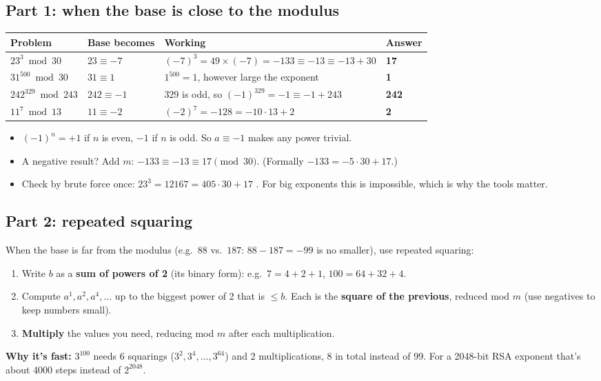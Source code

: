 \subsection{Part 1: when the base is close to the modulus}
\begin{center}\small
\begin{tabularx}{\textwidth}{@{}l l X l@{}}
\toprule
Problem & Base becomes & Working & Answer\\
\midrule
$23^3 \bmod 30$ & $23 \equiv -7$ & $(-7)^3 = 49 \times (-7) = -133 \equiv -13 \equiv -13 + 30$ & \textbf{17}\\
$31^{500} \bmod 30$ & $31 \equiv 1$ & $1^{500} = 1$, however large the exponent & \textbf{1}\\
$242^{329} \bmod 243$ & $242 \equiv -1$ & $329$ is odd, so $(-1)^{329} = -1 \equiv -1 + 243$ & \textbf{242}\\
$11^{7} \bmod 13$ & $11 \equiv -2$ & $(-2)^7 = -128 = -10\cdot13 + 2$ & \textbf{2}\\
\bottomrule
\end{tabularx}
\end{center}
\begin{itemize}
  \item $(-1)^n = +1$ if $n$ is even, $-1$ if $n$ is odd. So $a \equiv -1$ makes any power trivial.
  \item A negative result? Add $m$: $-133 \equiv -13 \equiv 17 \pmod{30}$. (Formally $-133 = -5\cdot30 + 17$.)
  \item Check by brute force once: $23^3 = 12167 = 405 \cdot 30 + 17$ \checkmark. For big exponents this is impossible, which is why the tools matter.
\end{itemize}

\subsection{Part 2: repeated squaring}
When the base is far from the modulus (e.g.\ $88$ vs.\ $187$: $88 - 187 = -99$ is no smaller), use repeated squaring:
\begin{keybox}[title=Repeated squaring]
\begin{enumerate}[leftmargin=1.5em]
  \item Write $b$ as a \textbf{sum of powers of 2} (its binary form): e.g.\ $7 = 4 + 2 + 1$, $100 = 64 + 32 + 4$.
  \item Compute $a^1, a^2, a^4, \dots$ up to the biggest power of 2 that is $\le b$. Each is the \textbf{square of the previous}, reduced mod $m$ (use negatives to keep numbers small).
  \item \textbf{Multiply} the values you need, reducing mod $m$ after each multiplication.
\end{enumerate}
\end{keybox}
\textbf{Why it's fast:} $3^{100}$ needs 6 squarings ($3^2, 3^4, \dots, 3^{64}$) and 2 multiplications, 8 in total instead of 99. For a 2048-bit RSA exponent that's about 4000 steps instead of $2^{2048}$.

